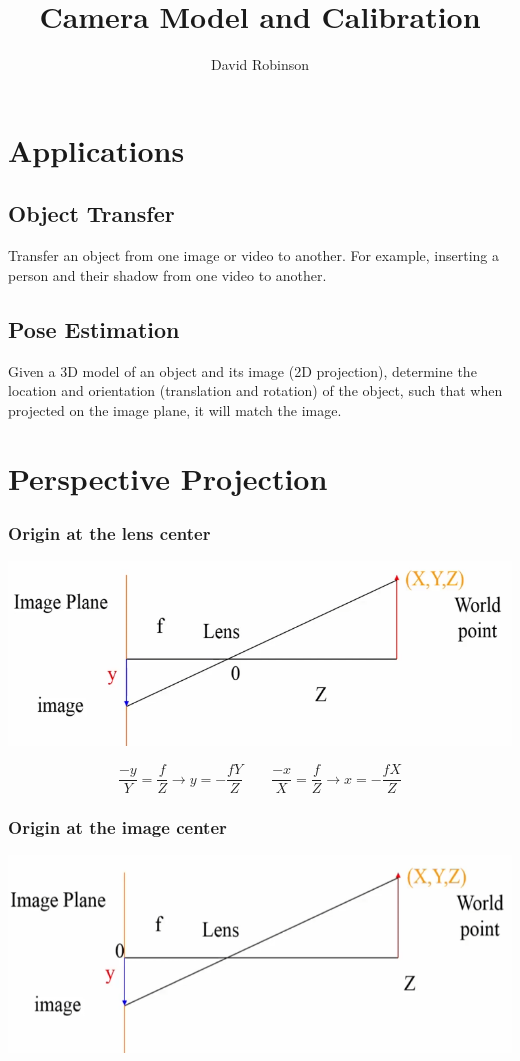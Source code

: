 \documentclass{article}
\title{Camera Model and Calibration}
\author{David Robinson}
\date{}
\begin{document}
\maketitle

\section*{Applications}
\subsection*{Object Transfer}
Transfer an object from one image or video to another. For example, inserting a person and their
shadow from one video to another.

\subsection*{Pose Estimation}
Given a 3D model of an object and its image (2D projection), determine the location and orientation
(translation and rotation) of the object, such that when projected on the image plane, it will
match the image.

\section*{Perspective Projection}
\subsubsection*{Origin at the lens center}
\includegraphics[scale=0.65]{perspective_lens.png}

\[\frac{-y}{Y}=\frac{f}{Z}\rightarrow y=-\frac{fY}{Z}\quad\quad \frac{-x}{X}=\frac{f}{Z}\rightarrow
x =-\frac{fX}{Z}\]

\subsubsection*{Origin at the image center}
\includegraphics[scale=0.5]{perspective_image.png}
\end{document}
